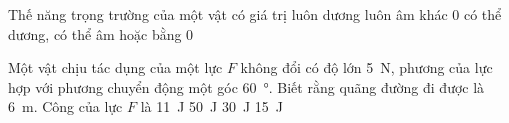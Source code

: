 \begin{ex}
	Thế năng trọng trường của một vật có giá trị
	\choice
	{luôn dương}
	{luôn âm}
	{khác 0}
	{\True có thể dương, có thể âm hoặc bằng 0}
	\loigiai{}
\end{ex}
\begin{ex}
	Một vật chịu tác dụng của một lực $F$ không đổi có độ lớn \SI{5}{\newton}, phương của lực hợp với phương chuyển động một góc \SI{60}{\degree}. Biết rằng quãng đường đi được là \SI{6}{\meter}. Công của lực $F$ là
	\choice
	{\SI{11}{\joule}}
	{\SI{50}{\joule}}
	{\SI{30}{\joule}}
	{\True \SI{15}{\joule}}
\end{ex}


